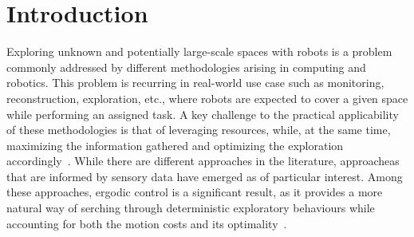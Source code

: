 \documentclass[letterpaper,10pt,conference,twoside]{IEEEtran}
\theoremstyle{definition}
\begin{document}
\section{Introduction}
\noindent
Exploring unknown and potentially large-scale spaces with robots is a problem commonly addressed by different methodologies arising in computing and robotics. This problem is recurring in real-world use case such as monitoring, reconstruction, exploration, etc., where robots are expected to cover a given space while performing an assigned task. A key challenge to the practical applicability of these methodologies is that of leveraging resources, while, at the same time, maximizing the information gathered and optimizing the exploration accordingly~\cite{popovic2020informative,schmid2020efficient}. 
While there are different approaches in the literature, approacheas that are informed by sensory data have emerged as of particular interest. Among these approaches, ergodic control is a significant result, as it provides a more natural way of serching through deterministic exploratory behaviours while accounting for both the motion costs and its optimality~\cite{miller2016ergodic}.
\end{document}
